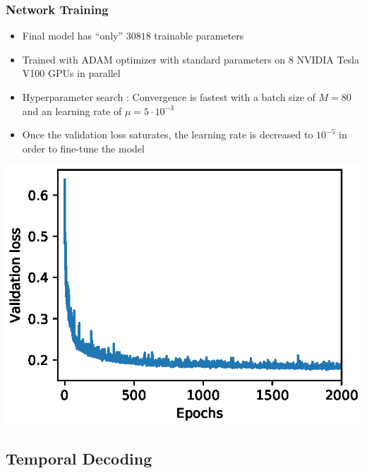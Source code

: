 \documentclass{beamer}
\begin{document}
\begin{frame}
\frametitle{Network Training}
\begin{itemize}
\item Final model has ``only'' $\num[group-separator={,}]{30818}$ trainable parameters
\item Trained with ADAM optimizer \cite{Kingma2014} with standard parameters on 8 NVIDIA Tesla V100 GPUs in parallel
\item Hyperparameter search \cite{nevergrad}: Convergence is fastest with a batch size of $M = 80$ and an learning rate of $\mu = 5 \cdot10^{-3}$
\item Once the validation loss saturates, the learning rate is decreased to $10^{-5}$ in order to fine-tune the model
\end{itemize}
\begin{minipage}{\textwidth} 
\centering
\includegraphics[scale=0.55]{figures/validation_loss.eps}
\end{minipage}
\end{frame}


\subsection{Temporal Decoding}
\end{document}
